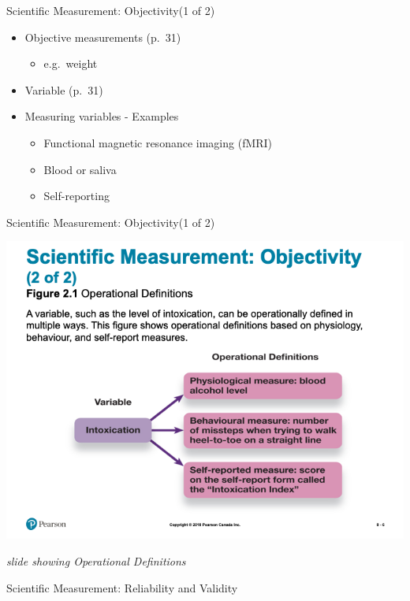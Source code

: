 \documentclass[
]{book}
\providecommand{\tightlist}{%
  \setlength{\itemsep}{0pt}\setlength{\parskip}{0pt}}
\begin{document}
Scientific Measurement: Objectivity(1 of 2)

\begin{itemize}
\tightlist
\item
  Objective measurements (p.~31)

  \begin{itemize}
  \tightlist
  \item
    e.g.~weight\\
  \end{itemize}
\item
  Variable (p.~31)\\
\item
  Measuring variables - Examples

  \begin{itemize}
  \tightlist
  \item
    Functional magnetic resonance imaging (fMRI)\\
  \item
    Blood or saliva\\
  \item
    Self-reporting
  \end{itemize}
\end{itemize}

Scientific Measurement: Objectivity(1 of 2)

\includegraphics{assets/unit_1/PSYC106-Chs2-ResearchandThoughtandLanguage-3rdEd.png}

\emph{slide showing Operational Definitions}

Scientific Measurement: Reliability and Validity
\end{document}
